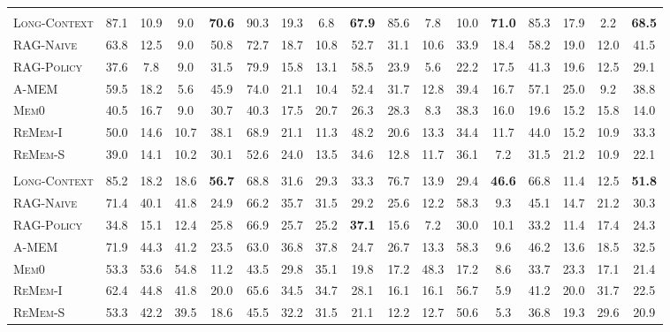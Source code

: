 \documentclass{llmxive}
\begin{document}
\begin{table}[t]
{\begin{tabular}{lccc>{\columncolor{cuscol}}c|ccc>{\columncolor{cuscol}}c|ccc>{\columncolor{cuscol}}c|ccc>{\columncolor{cuscol}}c}
\rowcolor{llmheader}
\multicolumn{17}{c}{\textbf{\texttt{Deepseek-V4-Pro}}} \\
\textsc{Long-Context} & 87.1 & 10.9 & 9.0 & \textbf{70.6} & 90.3 & 19.3 & 6.8 & \textbf{67.9} & 85.6 & 7.8 & 10.0 & \textbf{71.0} & 85.3 & 17.9 & 2.2 & \textbf{68.5} \\
\textsc{RAG-Naive}\citep{lewis2020retrieval}    & 63.8 & 12.5 & 9.0 & 50.8 & 72.7 & 18.7 & 10.8 & 52.7 & 31.1 & 10.6 & 33.9 & 18.4 & 58.2 & 19.0 & 12.0 & 41.5 \\
\textsc{RAG-Policy}   & 37.6 & 7.8 & 9.0 & 31.5 & 79.9 & 15.8 & 13.1 & 58.5 & 23.9 & 5.6 & 22.2 & 17.5 & 41.3 & 19.6 & 12.5 & 29.1 \\
\textsc{A-MEM}~\citep{xu2026mem}        & 59.5 & 18.2 & 5.6 & 45.9 & 74.0 & 21.1 & 10.4 & 52.4 & 31.7 & 12.8 & 39.4 & 16.7 & 57.1 & 25.0 & 9.2 & 38.8 \\
\textsc{Mem0}~\citep{chhikara2025mem0}         & 40.5 & 16.7 & 9.0 & 30.7 & 40.3 & 17.5 & 20.7 & 26.3 & 28.3 & 8.3 & 38.3 & 16.0 & 19.6 & 15.2 & 15.8 & 14.0 \\
\textsc{ReMem-I}~\citep{shu2026remem}      & 50.0 & 14.6 & 10.7 & 38.1 & 68.9 & 21.1 & 11.3 & 48.2 & 20.6 & 13.3 & 34.4 & 11.7 & 44.0 & 15.2 & 10.9 & 33.3 \\
\textsc{ReMem-S}~\citep{shu2026remem}      & 39.0 & 14.1 & 10.2 & 30.1 & 52.6 & 24.0 & 13.5 & 34.6 & 12.8 & 11.7 & 36.1 & 7.2 & 31.5 & 21.2 & 10.9 & 22.1 \\
\midrule

\rowcolor{llmheader}
\multicolumn{17}{c}{\textbf{\texttt{Llama-4-Maverick}}} \\
\textsc{Long-Context} & 85.2 & 18.2 & 18.6 & \textbf{56.7} & 68.8 & 31.6 & 29.3 & 33.3 & 76.7 & 13.9 & 29.4 & \textbf{46.6} & 66.8 & 11.4 & 12.5 & \textbf{51.8} \\
\textsc{RAG-Naive}\citep{lewis2020retrieval}    & 71.4 & 40.1 & 41.8 & 24.9 & 66.2 & 35.7 & 31.5 & 29.2 & 25.6 & 12.2 & 58.3 & 9.3 & 45.1 & 14.7 & 21.2 & 30.3 \\
\textsc{RAG-Policy}   & 34.8 & 15.1 & 12.4 & 25.8 & 66.9 & 25.7 & 25.2 & \textbf{37.1} & 15.6 & 7.2 & 30.0 & 10.1 & 33.2 & 11.4 & 17.4 & 24.3 \\
\textsc{A-MEM}~\citep{xu2026mem}        & 71.9 & 44.3 & 41.2 & 23.5 & 63.0 & 36.8 & 37.8 & 24.7 & 26.7 & 13.3 & 58.3 & 9.6 & 46.2 & 13.6 & 18.5 & 32.5 \\
\textsc{Mem0}~\citep{chhikara2025mem0}         & 53.3 & 53.6 & 54.8 & 11.2 & 43.5 & 29.8 & 35.1 & 19.8 & 17.2 & 48.3 & 17.2 & 8.6 & 33.7 & 23.3 & 17.1 & 21.4 \\
\textsc{ReMem-I}~\citep{shu2026remem}      & 62.4 & 44.8 & 41.8 & 20.0 & 65.6 & 34.5 & 34.7 & 28.1 & 16.1 & 16.1 & 56.7 & 5.9 & 41.2 & 20.0 & 31.7 & 22.5 \\
\textsc{ReMem-S}~\citep{shu2026remem}      & 53.3 & 42.2 & 39.5 & 18.6 & 45.5 & 32.2 & 31.5 & 21.1 & 12.2 & 12.7 & 50.6 & 5.3 & 36.8 & 19.3 & 29.6 & 20.9 \\
\midrule


\end{tabular}}
\end{table}
\end{document}
